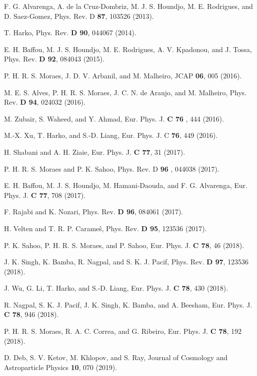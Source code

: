 \documentclass[aps,superscriptaddress, showpacs,preprintnumbers, superscriptaddress, nofootinbibt,twocolumn]{revtex4}
\begin{document}
\begin{thebibliography}{99}
 F. G. Alvarenga, A. de la Cruz-Dombriz, M. J. S. Houndjo, M.
E. Rodrigues, and D. Saez-Gomez, Phys. Rev. D \textbf{87}, 103526 (2013).

 T. Harko, Phys. Rev. {\bf D 90}, 044067 (2014).

 E. H. Baffou, M. J. S. Houndjo, M. E. Rodrigues, A. V.
Kpadonou, and J. Tossa, Phys. Rev. {\bf D 92}, 084043 (2015).

 P. H. R. S. Moraes, J. D. V. Arbanil, and M. Malheiro, JCAP
\textbf{06}, 005 (2016).

 M. E. S. Alves, P. H. R. S. Moraes, J. C. N. de Araujo, and
M. Malheiro, Phys. Rev. {\bf D 94}, 024032 (2016).

 M. Zubair, S. Waheed, and Y. Ahmad, Eur. Phys. J. {\bf C 76%
}, 444 (2016).

 M.-X. Xu, T. Harko, and S.-D. Liang, Eur. Phys. J. C \textbf{%
76}, 449 (2016).

 H. Shabani and A. H. Ziaie, Eur. Phys. J. {\bf C 77}, 31
(2017).

 P. H. R. S. Moraes and P. K. Sahoo, Phys. Rev. D \textbf{96}%
, 044038 (2017).

 E. H. Baffou, M. J. S. Houndjo, M. Hamani-Daouda, and F. G.
Alvarenga, Eur. Phys. J. {\bf C 77}, 708 (2017).

 F. Rajabi and K. Nozari, Phys. Rev. \textbf{D 96}, 084061
(2017).

 H. Velten and T. R. P. Carame\^{s}, Phys. Rev. {\bf D 95}, 123536 (2017).

 P. K. Sahoo, P. H. R. S. Moraes, and P. Sahoo, Eur. Phys. J.
{\bf C 78}, 46 (2018).

 J. K. Singh, K. Bamba, R. Nagpal, and S. K. J. Pacif, Phys. Rev. {\bf D 97}, 123536  (2018).

 J. Wu, G. Li, T. Harko, and S.-D. Liang,  Eur. Phys. J. {\bf C 78}, 430 (2018).

 R. Nagpal, S. K. J. Pacif, J. K. Singh, K. Bamba, and A. Beesham, Eur. Phys. J. {\bf C 78},  946 (2018).

 P. H. R. S. Moraes,  R. A. C. Correa, and G. Ribeiro, Eur. Phys. J. {\bf C  78},  192 (2018).

 D. Deb, S. V. Ketov, M. Khlopov, and S. Ray, Journal of Cosmology and Astroparticle Physics {\bf 10},  070 (2019).


\end{thebibliography}
\end{document}

